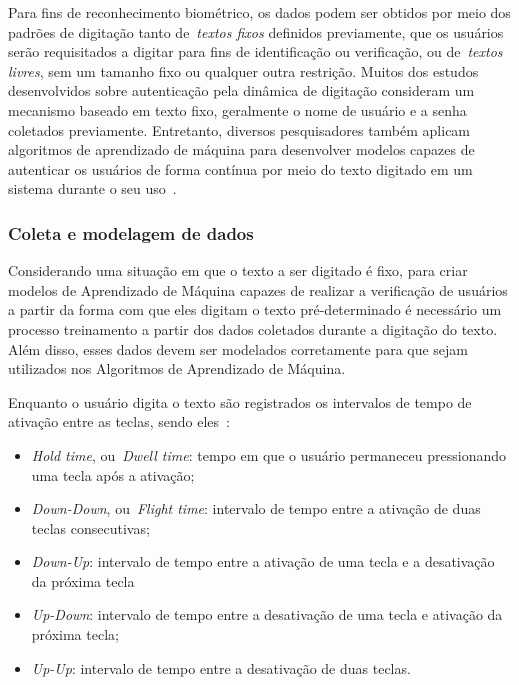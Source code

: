 Para fins de reconhecimento biométrico, os dados podem ser obtidos por meio dos padrões de digitação tanto de~\textit{textos fixos} definidos previamente, que os usuários serão requisitados a digitar para fins de identificação ou verificação, ou de~\textit{textos livres}, sem um tamanho fixo ou qualquer outra restrição. Muitos dos estudos desenvolvidos sobre autenticação pela dinâmica de digitação consideram um mecanismo baseado em texto fixo, geralmente o nome de usuário e a senha coletados previamente. Entretanto, diversos pesquisadores também aplicam algoritmos de aprendizado de máquina para desenvolver modelos capazes de autenticar os usuários de forma contínua por meio do texto digitado em um sistema durante o seu uso~\cite{continuous_auth_by_free_text_keystroke_based_on_cnn_and_rnn}.


\subsubsection{Coleta e modelagem de dados}\label{subsubsec:coleta_e_modelagem}

Considerando uma situação em que o texto a ser digitado é fixo, para criar modelos de Aprendizado de Máquina capazes de realizar a verificação de usuários a partir da forma com que eles digitam o texto pré-determinado é necessário um processo treinamento a partir dos dados coletados durante a digitação do texto. Além disso, esses dados devem ser modelados corretamente para que sejam utilizados nos Algoritmos de Aprendizado de Máquina.

Enquanto o usuário digita o texto são registrados os intervalos de tempo de ativação entre as teclas, sendo eles~\cite{Dias2023keyrecs}:

\begin{itemize}
    \item{\textit{Hold time}, ou~\textit{Dwell time}}: tempo em que o usuário permaneceu pressionando uma tecla após a ativação;
    \item{\textit{Down-Down}, ou~\textit{Flight time}}: intervalo de tempo entre a ativação de duas teclas consecutivas;
    \item{\textit{Down-Up}}: intervalo de tempo entre a ativação de uma tecla e a desativação da próxima tecla
    \item{\textit{Up-Down}}: intervalo de tempo entre a desativação de uma tecla e ativação da próxima tecla;
    \item{\textit{Up-Up}}: intervalo de tempo entre a desativação de duas teclas.
\end{itemize}

